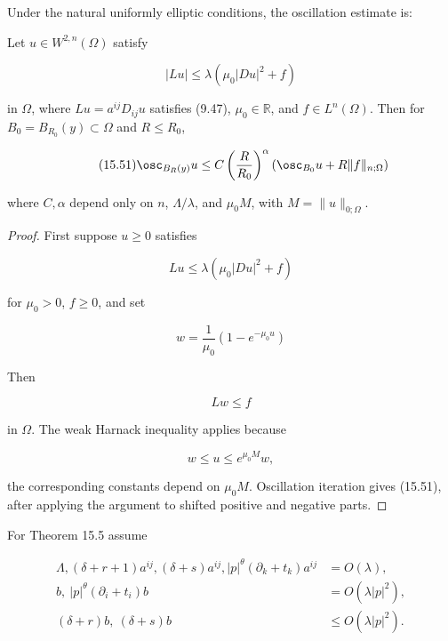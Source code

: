 Under the natural uniformly elliptic conditions, the oscillation estimate is:

\begin{lemma}\label{gilbarg-trudinger.lem.15.4.oscillation-quadratic-growth}
Let \(u\in W^{2,n}(\Omega)\) satisfy

\begin{equation}
\tag{15.50}
|Lu| \leq \lambda(\mu_0|Du|^2 + f)
\end{equation}

in $\Omega$, where $Lu=a^{ij}D_{ij}u$ satisfies (9.47), $\mu_0\in\mathbb R$, and
$f\in L^n(\Omega)$. Then for $B_0=B_{R_0}(y)\subset\Omega$ and $R\leq R_0$,

\begin{equation}
\tag{15.51}
\osc_{B_R(y)} u \leq C\left(\frac{R}{R_0}\right)^\alpha \left(\osc_{B_0}u + R\|f\|_{n;\Omega}\right)
\end{equation}

where $C,\alpha$ depend only on $n$, $\Lambda/\lambda$, and $\mu_0M$, with
$M=\|u\|_{0;\Omega}$.
\end{lemma}

\begin{proof}
\sketch First suppose $u\geq0$ satisfies

\begin{equation}
\tag{15.52}
Lu \leq \lambda(\mu_0|Du|^2 + f)
\end{equation}

for \(\mu_0>0\), \(f\ge0\), and set

\[
w = \frac{1}{\mu_0}\left(1 - e^{-\mu_0 u}\right)
\]



Then

\[
Lw \leq f
\]

in \(\Omega\). The weak Harnack inequality applies because

\[
w \leq u \leq e^{\mu_0 M}w,
\]

the corresponding constants depend on \(\mu_0M\). Oscillation iteration gives
(15.51), after applying the argument to shifted positive and negative parts.
\end{proof}

For Theorem 15.5 assume

\begin{equation}\tag{15.53}
\begin{aligned}
\Lambda,(\delta+r+1)a^{ij},(\delta+s)a^{ij},
 |p|^\theta(\partial_k+t_k)a^{ij}&=O(\lambda),\\
b,\ |p|^\theta(\partial_i+t_i)b&=O(\lambda|p|^2),\\
(\delta+r)b,\ (\delta+s)b&\leq O(\lambda|p|^2).
\end{aligned}
\end{equation}

